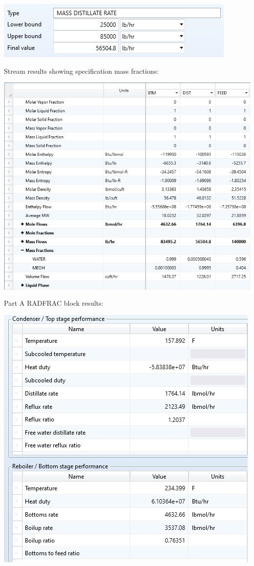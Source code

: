\documentclass[12pt]{article}
\begin{document}
\begin{center}
    \includegraphics{distillate rate spec B.png}
\end{center}
Stream results showing specification mass fractions:
\begin{center}
    \includegraphics[scale=0.8]{stream results.png}
\end{center}
Part A RADFRAC block results:
\begin{center}
    \includegraphics{radfrac results.png}
\end{center}
\end{document}
